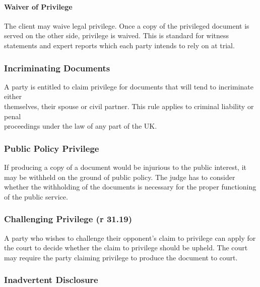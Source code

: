\documentclass[
]{article}
\begin{document}
\hypertarget{waiver-of-privilege}{%
\paragraph{Waiver of Privilege}\label{waiver-of-privilege}}

The client may waive legal privilege. Once a copy of the privileged
document is served on the other side, privilege is waived. This is
standard for witness statements and expert reports which each party
intends to rely on at trial.

\hypertarget{incriminating-documents}{%
\subsubsection{Incriminating Documents}\label{incriminating-documents}}

A party is entitled to claim privilege for documents that will tend to
incriminate either\\
themselves, their spouse or civil partner. This rule applies to criminal
liability or penal\\
proceedings under the law of any part of the UK.

\hypertarget{public-policy-privilege}{%
\subsubsection{Public Policy Privilege}\label{public-policy-privilege}}

If producing a copy of a document would be injurious to the public
interest, it may be withheld on the ground of public policy. The judge
has to consider whether the withholding of the documents is necessary
for the proper functioning of the public service.

\hypertarget{challenging-privilege-r-31.19}{%
\subsubsection{Challenging Privilege (r
31.19)}\label{challenging-privilege-r-31.19}}

A party who wishes to challenge their opponent's claim to privilege can
apply for the court to decide whether the claim to privilege should be
upheld. The court may require the party claiming privilege to produce
the document to court.

\hypertarget{inadvertent-disclosure}{%
\subsubsection{Inadvertent Disclosure}\label{inadvertent-disclosure}}
\end{document}

